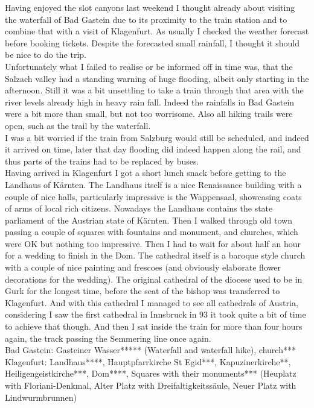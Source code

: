 {Having enjoyed the slot canyons last weekend I thought already about visiting the waterfall of Bad Gastein due to its proximity to the train station and to combine that with a visit of Klagenfurt. As usually I checked the weather forecast before booking tickets. Despite the forecasted small rainfall, I thought it should be nice to do the trip.\\

Unfortunately what I failed to realise or be informed off in time was, that the Salzach valley had a standing warning of huge flooding, albeit only starting in the afternoon. Still it was a bit unsettling to take a train through that area with the river levels already high in heavy rain fall. Indeed the rainfalls in Bad Gastein were a bit more than small, but not too worrisome. Also all hiking trails were open, such as the trail by the waterfall.\\

I was a bit worried if the train from Salzburg would still be scheduled, and indeed it arrived on time, later that day flooding did indeed happen along the rail, and thus parts of the trains had to be replaced by buses.\\
Having arrived in Klagenfurt I got a short lunch snack before getting to the Landhaus of K\"arnten. The Landhaus itself is a nice Renaissance building with a couple of nice halls, particularly impressive is the Wappensaal, showcasing coats of arms of local rich citizens. Nowadays the Landhaus contains the state parliament of the Austrian state of K\"arnten. Then I walked through old town passing a couple of squares with fountains and monument, and churches, which were OK but nothing too impressive. Then I had to wait for about half an hour for a wedding to finish in the Dom. The cathedral itself is a baroque style church with a couple of nice painting and frescoes (and obviously elaborate flower decorations for the wedding). The original cathedral of the diocese used to be in Gurk for the longest time, before the seat of the bishop was transferred to Klagenfurt. And with this cathedral I managed to see all cathedrals of Austria, considering I saw the first cathedral in Innsbruck in 93 it took quite a bit of time to achieve that though. And then I sat inside the train for more than four hours again, the track passing the Semmering line once again.\\

Bad Gastein: Gasteiner Wasser***** (Waterfall and waterfall hike), church***\\
Klagenfurt: Landhaus****, Hauptpfarrkirche St Egid***, Kapuzinerkirche**, Heiligengeistkirche***, Dom****, Squares with their monuments*** (Heuplatz with Floriani-Denkmal, Alter Platz with Dreifaltigkeitss\"aule, Neuer Platz with Lindwurmbrunnen)\\

}
